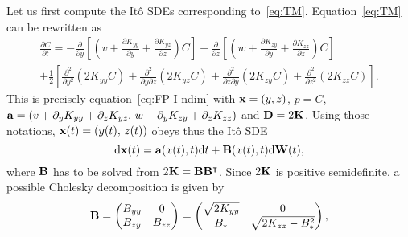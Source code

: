 Let us first compute the Itô SDEs corresponding to~\eqref{eq:TM}. Equation~\eqref{eq:TM} can be rewritten as
\begin{multline}
	\frac{\partial C}{\partial t} = -\frac{\partial}{\partial y}\left[\left(v+\frac{\partial K_{yy}}{\partial y} + \frac{\partial K_{yz}}{\partial z}\right)C\right] -\frac{\partial}{\partial z}\left[\left(w+\frac{\partial K_{zy}}{\partial y} + \frac{\partial K_{zz}}{\partial z}\right)C\right]\\
	+ \frac{1}{2}\left[\frac{\partial^2}{\partial y^2} \left(2K_{yy} C\right) + \frac{\partial^2}{\partial y \partial z} \left(2K_{yz} C\right) + \frac{\partial^2}{\partial z \partial y} \left(2K_{zy} C\right) + \frac{\partial^2}{\partial z^2} \left(2K_{zz} C\right) \right].
\end{multline}
This is precisely equation~\eqref{eq:FP-I-ndim} with $\mathbf x =(y,z)$, $p=C$, $\mathbf a = (v+\partial_y K_{yy} + \partial_z K_{yz},\, w+\partial_y K_{zy} + \partial_z K_{zz})$ and $\mathbf D = 2\mathbf K$. Using those notations, $\mathbf x(t) = (y(t),\, z(t))$ obeys thus the Itô SDE
\begin{equation} \label{eq:ito-TM-vec}
	\mathrm d \mathbf x(t) = \mathbf a(x(t),t) \mathrm dt + \mathbf B(x(t),t) \mathrm d \mathbf W(t),
\end{equation}
where $\mathbf B$ has to be solved from $2\mathbf K = \mathbf B \mathbf B^{\intercal}$. Since $2\mathbf K$ is positive semidefinite, a possible Cholesky decomposition is given by
\begin{equation} \label{eq:B}
	\mathbf B = \begin{pmatrix} B_{yy} & 0 \\ B_{zy} & B_{zz} \end{pmatrix} = \begin{pmatrix} \sqrt{2K_{yy}} & 0 \\ B_* & \sqrt{2K_{zz}-B_*^2} \end{pmatrix},
\end{equation}
